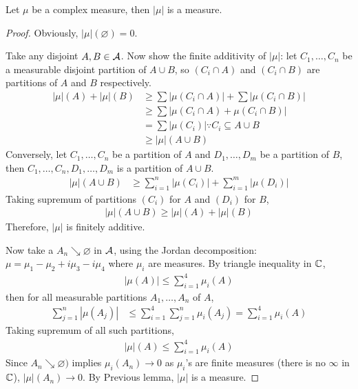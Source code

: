\documentclass[11pt]{article}
\begin{document}
	\begin{proposition}
		Let $\mu$ be a complex measure, then $|\mu|$ is a measure.
		\begin{proof}
			Obviously, $|\mu|(\varnothing) = 0$.
			
			Take any disjoint $A, B \in \mathcal{{A}}$.
			Now show the finite additivity of $|\mu|$: let $C_1, \dots, C_n$ be a measurable disjoint partition of $A \cup B$, so $(C_i \cap A)$ and $(C_i \cap B)$ are partitions of $A$ and $B$ respectively.
			\begin{align}
				|\mu|(A)  + |\mu|(B) &\geq \sum |\mu(C_i \cap A)| + \sum |\mu(C_i \cap B)| \\
				&\geq \sum |\mu(C_i \cap A)+\mu(C_i \cap B)| \\
				&=\sum |\mu(C_i)| \because C_i \subseteq A \cup B \\
				&\geq |\mu| (A \cup B)
			\end{align}
			Conversely, let $C_1, \dots, C_n$ be a partition of $A$ and $D_1, \dots, D_m$ be a partition of $B$, then $C_1, \dots, C_n, D_1, \dots, D_m$ is a partition of $A \cup B$.
			\begin{align}
				|\mu|(A\cup B) &\geq \sum_{i=1}^n |\mu(C_i)| + \sum_{i=1}^m |\mu(D_i)|
			\end{align}
			Taking supremum of partitions $(C_i)$ for $A$ and $(D_i)$ for $B$,
			\begin{align}
				|\mu|(A \cup B) \geq |\mu|(A) + |\mu|(B)
			\end{align}
			Therefore, $|\mu|$ is finitely additive.
			
			Now take a $A_n \searrow \varnothing$ in $\mathcal{{A}}$, using the Jordan decomposition: $\mu = \mu_1 - \mu_2 + i \mu_3 - i \mu_4$ where $\mu_i$ are measures.
			By triangle inequality in $\mathbb{C}$,
			\begin{align}
				|\mu(A)| \leq \sum_{i=1}^4 \mu_i(A)
			\end{align}
			then for all measurable partitions $A_1, \dots, A_n$ of $A$,
			\begin{align}
				\sum_{j=1}^n |\mu(A_j)| &\leq \sum_{i=1}^4 \sum_{j=1}^n \mu_i(A_j) = \sum_{i=1}^4 \mu_i(A)
			\end{align}
			Taking supremum of all such partitions,
			\begin{align}
				|\mu|(A) \leq \sum_{i=1}^4 \mu_i(A)
			\end{align}
			Since $A_n \searrow \varnothing)$ implies $\mu_i(A_n) \to 0$ as $\mu_i$'s are finite measures (there is no $\infty$ in $\mathbb{C}$), $|\mu|(A_n) \to 0$.
			By Previous lemma, $|\mu|$ is a measure.
		\end{proof}
	\end{proposition}
\end{document}

